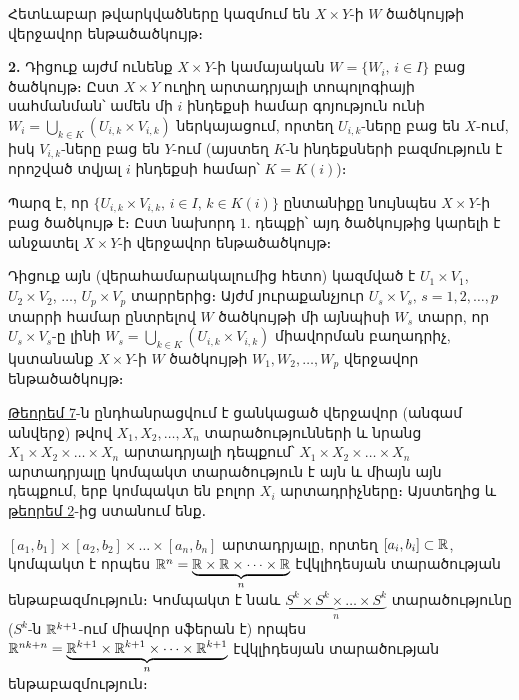 \documentclass[./main.tex]{subfiles}
\begin{document}
\begin{varproof}
\par Հետևաբար թվարկվածները կազմում են $X \times Y$-ի $W$ ծածկույթի վերջավոր են\-թա\-ծածկույթ։

\par \textbf{2.} Դիցուք այժմ ունենք $X\times Y$-ի կամայական $W=\{ W_i,\, i\in I\}$ բաց ծածկույթ։ Ըստ $X\times Y$ ուղիղ արտադրյալի տոպոլոգիայի սահմանման՝ ամեն մի $i$ ինդեքսի համար գոյություն ունի $W_i=\bigcup\limits_{k\in K}(U_{i,k}\times V_{i,k})$ ներկայացում, որտեղ $U_{i,k}$-ները բաց են $X$-ում, իսկ $V_{i,k}$-ները բաց են $Y$-ում (այստեղ $K$-ն ինդեքսների բազմություն է որոշված տվյալ $i$ ինդեքսի համար՝ $K=K(i)$)։
\par Պարզ է, որ $\{U_{i,k}\times V_{i,k},\, i\in I,\, k\in K(i)\}$ ընտանիքը նույնպես $X\times Y$-ի բաց ծածկույթ է։ Ըստ նախորդ $1.$ դեպքի՝ այդ ծածկույթից կարելի է անջատել $X\times Y$-ի վերջավոր ենթածածկույթ։ 
\par Դիցուք այն (վերահամարակալումից հետո) կազմված է $U_1\times V_1$, $U_2\times V_2$, $\dots$, ${U_p\times V_p}$ տարրերից։ Այժմ յուրաքանչյուր $U_s\times V_s,\, s=1,2,\dots,p$ տարրի համար ընտ\-րե\-լով $W$ ծածկույթի մի այնպիսի $W_s$ տարր, որ $U_s\times V_s$-ը լինի ${W_s=\bigcup\limits_{k\in K}(U_{i,k}\times V_{i,k})}$ միա\-վորման բաղադրիչ, կստանանք $X\times Y$-ի $W$ ծածկույթի $W_1, W_2, \dots, W_p$ վեր\-ջա\-վոր ենթածածկույթ։
\end{varproof}

\par \hyperref[ch16thm7]{Թեորեմ 7}-ն ընդհանրացվում է ցանկացած վերջավոր (անգամ անվերջ) թվով $X_1,X_2,\dots,X_n$ տարածությունների և նրանց $X_1\times X_2\times \dots\times X_n $ արտադրյալի դեպքում՝ $X_1\times X_2\times \dots\times X_n$ արտադրյալը կոմպակտ տարածություն է այն և միայն այն դեպքում, երբ կոմպակտ են բոլոր $X_i$ արտադրիչները։ Այստեղից և \hyperref[ch16thm2]{թեորեմ 2}-ից ստանում ենք․

\begin{hetevanq}\label{ch16cor4}
$[a_1,b_1]\times [a_2,b_2]\times \dots \times [a_n,b_n]$ արտադրյալը, որտեղ $[a_i,b_i]\subset \mathbb{R}$, կոմպակտ է որպես $\mathbb{R}^n=\underbrace{\mathbb{R}\times \mathbb{R} \times \dots \times \mathbb{R}}_\text{$n$}$ էվկլիդեսյան տարածության են\-թա\-բազ\-մու\-թյուն։ Կոմպակտ է նաև  $\underbrace{S^k\times S^k\times\dots\times S^k}_\text{$n$}$ տարածությունը ($S^k$-ն $\mathbb{R}^{k+1}$-ում մի\-ա\-վոր սֆե\-րան է) որպես $\mathbb{R}^{nk+n}=\underbrace{\mathbb{R}^{k+1}\times \mathbb{R}^{k+1}\times \dots \times \mathbb{R}^{k+1}}_\text{$n$}$ էվկլիդեսյան տա\-րա\-ծու\-թյան ենթաբազմություն։
\end{hetevanq}
\end{document}
